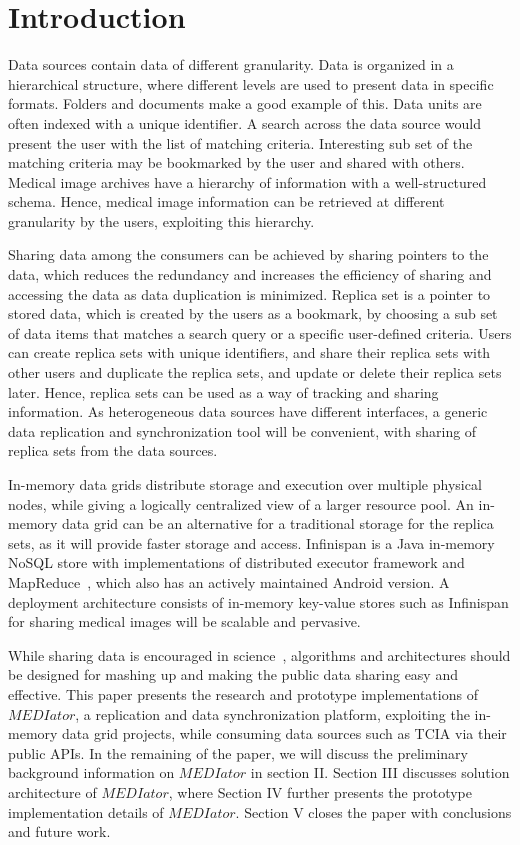 \documentclass[conference]{IEEEtran}
\begin{document}
\IEEEpeerreviewmaketitle

\section{Introduction}
Data sources contain data of different granularity. Data is organized in a hierarchical structure, where different levels are used to present data in specific formats. Folders and documents make a good example of this. Data units are often indexed with a unique identifier. A search across the data source would present the user with the list of matching criteria. Interesting sub set of the matching criteria may be bookmarked by the user and shared with others. Medical image archives have a hierarchy of information with a well-structured schema. Hence, medical image information can be retrieved at different granularity by the users, exploiting this hierarchy.

Sharing data among the consumers can be achieved by sharing pointers to the data, which reduces the redundancy and increases the efficiency of sharing and accessing the data as data duplication is minimized. Replica set is a pointer to stored data, which is created by the users as a bookmark, by choosing a sub set of data items that matches a search query or a specific user-defined criteria. Users can create replica sets with unique identifiers, and share their replica sets with other users and duplicate the replica sets, and update or delete their replica sets later. Hence, replica sets can be used as a way of tracking and sharing information. As heterogeneous data sources have different interfaces, a generic data replication and synchronization tool will be convenient, with sharing of replica sets from the data sources. 

In-memory data grids distribute storage and execution over multiple physical nodes, while giving a logically centralized view of a larger resource pool. An in-memory data grid can be an alternative for a traditional storage for the replica sets, as it will provide faster storage and access. Infinispan is a Java in-memory NoSQL store with implementations of distributed executor framework and MapReduce~\cite{infinispan}, which also has an actively maintained Android version. A deployment architecture consists of in-memory key-value stores such as Infinispan for sharing medical images will be scalable and pervasive.

While sharing data is encouraged in science~\cite{szala2006science}, algorithms and architectures should be designed for mashing up and making the public data sharing easy and effective. This paper presents the research and prototype implementations of $MEDIator$, a replication and data synchronization platform, exploiting the in-memory data grid projects, while consuming data sources such as TCIA via their public APIs. In the remaining of the paper, we will discuss the preliminary background information on $MEDIator$ in section II. Section III discusses solution architecture of $MEDIator$, where Section IV further presents the prototype implementation details of $MEDIator$. Section V closes the paper with conclusions and future work.
\end{document}
